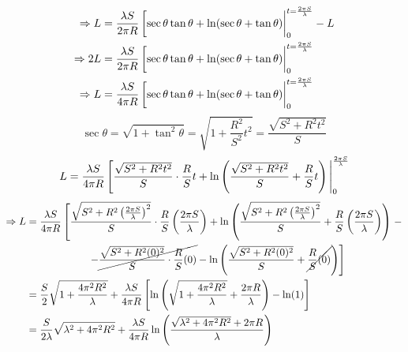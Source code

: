 \begin{align}
    \Rightarrow L  & = \frac{\lambda S}{2\pi R}\eval[\sec{\theta}\tan{\theta}+\ln(\sec{\theta}+\tan{\theta})|_0^{t =\frac{2\pi S}{\lambda}} - L \notag           \\
    \Rightarrow 2L & = \frac{\lambda S}{2\pi R}\eval[\sec{\theta}\tan{\theta}+\ln(\sec{\theta}+\tan{\theta})|_0^{t =\frac{2\pi S}{\lambda}} \notag               \\
    \Rightarrow L  & = \frac{\lambda S}{4\pi R}\eval[\sec {\theta}\tan{\theta}+\ln(\sec{\theta}+\tan{\theta})|_0^{t =\frac{2\pi S}{\lambda}} \label{eq:trig_int}
\end{align}
\begin{equation*}
    \sec{\theta} = \sqrt{1+\tan^2{\theta}} =\sqrt{1+\frac{R^2}{S^2}t^2} = \frac{\sqrt{S^2+R^2t^2}}{S}
\end{equation*}
\begin{equation}
    L = \frac{\lambda S}{4\pi R}\eval[\frac{\sqrt{S^2+R^2t^2}}{S}\cdot\frac{R}{S}t+\ln\left(\frac{\sqrt{S^2+R^2t^2}}{S}+\frac{R}{S}t\right)|_0^{\frac{2\pi S}{\lambda}}
\end{equation}
\begin{align*}
    \Rightarrow L &= \frac{\lambda S}{4\pi R}\left[\frac{\sqrt{S^2+R^2\left(\frac{2\pi S}{\lambda}\right)^2}}{S}\cdot\frac{R}{S}\left(\frac{2\pi S}{\lambda}\right)+\ln\left(\frac{\sqrt{S^2+R^2\left(\frac{2\pi S}{\lambda}\right)^2}}{S}+\frac{R}{S}\left(\frac{2\pi S}{\lambda}\right)\right)\right.- \\
    &\qquad\qquad\qquad \left.-\cancel{\frac{\sqrt{S^2+R^2(0)^2}}{S}\cdot\frac{R}{S}(0)}-\ln\left(\frac{\sqrt{S^2+R^2(0)^2}}{S}+\cancel{\frac{R}{S}(0)}\right)\right] \\ 
    &= \frac{S}{2}\sqrt{1+\frac{4\pi^2R^2}{\lambda}}+\frac{\lambda S}{4\pi R}\left[\ln\left(\sqrt{1+\frac{4\pi^2R^2}{\lambda}}+\frac{2\pi R}{\lambda}\right)-\ln(1)\right] \\
    &= \frac{S}{2 \lambda}\sqrt{\lambda^2+4\pi^2R^2}+\frac{\lambda S}{4\pi R}\ln\left(\frac{\sqrt{\lambda^2+4\pi^2R^2}+2\pi R}{\lambda}\right)
\end{align*}
